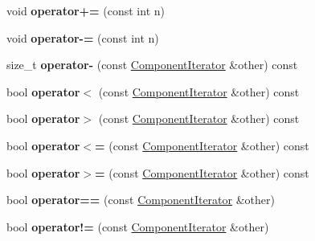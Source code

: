 \begin{DoxyCompactItemize}
\item 
\hypertarget{structComponentIterator_aa31e6996dd188992bf3ead9c6e8de31b}{}\label{structComponentIterator_aa31e6996dd188992bf3ead9c6e8de31b} 
void {\bfseries operator+=} (const int n)
\item 
\hypertarget{structComponentIterator_a626ddae3b36436c8be60f08a485ca3e2}{}\label{structComponentIterator_a626ddae3b36436c8be60f08a485ca3e2} 
void {\bfseries operator-\/=} (const int n)
\item 
\hypertarget{structComponentIterator_a0ace5af59b7a28691e2c47aecd663925}{}\label{structComponentIterator_a0ace5af59b7a28691e2c47aecd663925} 
size\+\_\+t {\bfseries operator-\/} (const \hyperlink{structComponentIterator}{Component\+Iterator} \&other) const
\item 
\hypertarget{structComponentIterator_a7902a36a55188e90ec6dd2e29150d180}{}\label{structComponentIterator_a7902a36a55188e90ec6dd2e29150d180} 
bool {\bfseries operator$<$} (const \hyperlink{structComponentIterator}{Component\+Iterator} \&other) const
\item 
\hypertarget{structComponentIterator_a44d0db9c4573423b896f00bfebb42a45}{}\label{structComponentIterator_a44d0db9c4573423b896f00bfebb42a45} 
bool {\bfseries operator$>$} (const \hyperlink{structComponentIterator}{Component\+Iterator} \&other) const
\item 
\hypertarget{structComponentIterator_a52edd362550b70dc96a1f91251602645}{}\label{structComponentIterator_a52edd362550b70dc96a1f91251602645} 
bool {\bfseries operator$<$=} (const \hyperlink{structComponentIterator}{Component\+Iterator} \&other) const
\item 
\hypertarget{structComponentIterator_a9ad2cf77ccf9b33b59ae3e299e8d78e6}{}\label{structComponentIterator_a9ad2cf77ccf9b33b59ae3e299e8d78e6} 
bool {\bfseries operator$>$=} (const \hyperlink{structComponentIterator}{Component\+Iterator} \&other) const
\item 
\hypertarget{structComponentIterator_ac6ba955d23b2902d9b7a82582319b86b}{}\label{structComponentIterator_ac6ba955d23b2902d9b7a82582319b86b} 
bool {\bfseries operator==} (const \hyperlink{structComponentIterator}{Component\+Iterator} \&other)
\item 
\hypertarget{structComponentIterator_a512b0556981741aa1e3a8ec8c2aafd2b}{}\label{structComponentIterator_a512b0556981741aa1e3a8ec8c2aafd2b} 
bool {\bfseries operator!=} (const \hyperlink{structComponentIterator}{Component\+Iterator} \&other)
\end{DoxyCompactItemize}
